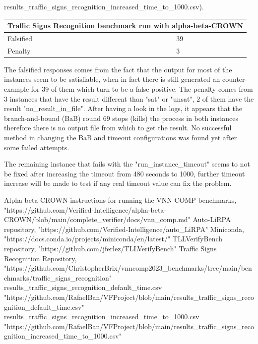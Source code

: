 \documentclass[12pt,a4paper]{report}
\theoremstyle{definition}
\theoremstyle{remark}
\begin{document}
results\_traffic\_signs\_recognition\_increased\_time\_to\_1000.csv\cite{traffic_signs_recognition_second_solution}).

\vspace{8pt}
\begin{tabular}{ |p{3cm}|p{3cm}|  }
 \hline
 \multicolumn{2}{|c|}{Traffic Signs Recognition benchmark run with alpha-beta-CROWN} \\
 \hline
 Falsified& 39\\
 \hline
 Penalty   & 3\\
 \hline
\end{tabular}
\vspace{10pt}

The falsified responses comes from the fact that the output for most of the instances seem to be satisfiable, when in fact there is still generated an counter-example for 39 of them which turn to be a false positive. The penalty comes from 3 instances that have the result different than "sat" or "unsat", 2 of them have the result "no\_result\_in\_file". After having a look in the logs, it appears that the branch-and-bound (BaB) round 69 stops (kills) the process in both instances therefore there is no output file from which to get the result. No successful method in changing the BaB and timeout configurations was found yet after some failed attempts.

The remaining instance that fails with the "run\_instance\_timeout" seems to not be fixed after increasing the timeout from 480 seconds to 1000, further timeout increase will be made to test if any real timeout value can fix the problem.
\begin{thebibliography}{1}
 Alpha-beta-CROWN instructions for running the VNN-COMP benchmarks, "https://github.com/Verified-Intelligence/alpha-beta-CROWN/blob/main/complete\_verifier/docs/vnn\_comp.md"
 Auto-LiRPA repository, "https://github.com/Verified-Intelligence/auto\_LiRPA"
 Miniconda, "https://docs.conda.io/projects/miniconda/en/latest/"
 TLLVerifyBench repository, "https://github.com/jferlez/TLLVerifyBench"
 Traffic Signs Recognition Repository, "https://github.com/ChristopherBrix/vnncomp2023\_benchmarks/tree/main/benchmarks/traffic\_signs\_recognition"
 results\_traffic\_signs\_recognition\_default\_time.csv
"https://github.com/RafaelBan/VFProject/blob/main/results\_traffic\_signs\_recognition\_default\_time.csv"
 results\_traffic\_signs\_recognition\_increased\_time\_to\_1000.csv
"https://github.com/RafaelBan/VFProject/blob/main/results\_traffic\_signs\_recognition\_increased\_time\_to\_1000.csv"
\end{thebibliography}
\end{document}
